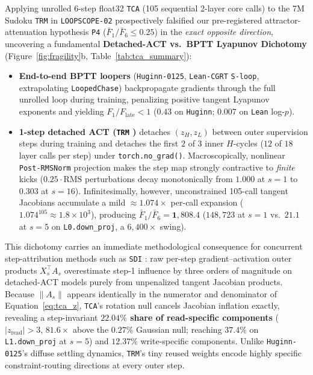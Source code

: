 \documentclass[10pt,letterpaper]{article}
\begin{document}
Applying unrolled 6-step float32 \texttt{TCA} (105 sequential 2-layer core calls) to the 7M Sudoku \texttt{TRM} in \texttt{LOOPSCOPE-02} prospectively falsified our pre-registered attractor-attenuation hypothesis \texttt{P4} ($\bar{F}_1/\bar{F}_6 \le 0.25$) in the \emph{exact opposite direction}, uncovering a fundamental \textbf{Detached-ACT vs.\ BPTT Lyapunov Dichotomy} (Figure~\ref{fig:fragility}b, Table~\ref{tab:tca_summary}):
\begin{itemize}
  \item \textbf{End-to-end BPTT loopers} (\texttt{Huginn-0125}, \texttt{Lean-CGRT} \texttt{S-loop}, extrapolating \texttt{LoopedChase}) backpropagate gradients through the full unrolled loop during training, penalizing positive tangent Lyapunov exponents and yielding $F_1 / F_{\mathrm{late}} < 1$ ($0.43$ on \texttt{Huginn}; $0.007$ on \texttt{Lean} log-$p$).
  \item \textbf{1-step detached ACT (\texttt{TRM} \cite{jolicoeur2025trm})} detaches $(z_H, z_L)$ between outer supervision steps during training and detaches the first $2$ of $3$ inner $H$-cycles ($12$ of $18$ layer calls per step) under \texttt{torch.no\_grad()}. Macroscopically, nonlinear \texttt{Post-RMSNorm} projection makes the step map strongly contractive to \emph{finite} kicks ($0.25\cdot\mathrm{RMS}$ perturbations decay monotonically from $1.000$ at $s=1$ to $0.303$ at $s=16$). Infinitesimally, however, unconstrained 105-call tangent Jacobians accumulate a mild $\approx 1.074\times$ per-call expansion ($1.074^{105} \approx 1.8\times 10^3$), producing $\bar{F}_1 / \bar{F}_6 = \mathbf{1{,}808.4}$ ($148{,}723$ at $s=1$ vs.\ $21.1$ at $s=5$ on \texttt{L0.down\_proj}, a $6{,}400\times$ swing).
\end{itemize}

This dichotomy carries an immediate methodological consequence for concurrent step-attribution methods such as \texttt{SDI} \cite{kaissis2026sdi}: raw per-step gradient--activation outer products $X_s^\top A_s$ overestimate step-1 influence by three orders of magnitude on detached-ACT models purely from unpenalized tangent Jacobian products. Because $\|A_s\|$ appears identically in the numerator and denominator of Equation~\eqref{eq:tca_z}, \texttt{TCA}'s rotation null cancels Jacobian inflation exactly, revealing a step-invariant \textbf{$22.04\%$ share of read-specific components} ($|z_{\mathrm{read}}| > 3$, $81.6\times$ above the $0.27\%$ Gaussian null; reaching $37.4\%$ on \texttt{L1.down\_proj} at $s=5$) and $12.37\%$ write-specific components. Unlike \texttt{Huginn-0125}'s diffuse settling dynamics, \texttt{TRM}'s tiny reused weights encode highly specific constraint-routing directions at every outer step.
\end{document}

